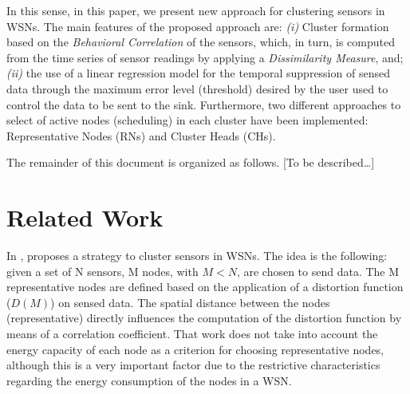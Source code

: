 \documentclass[conference]{IEEEtran}
\begin{document}
In this sense, in this paper, we present new approach for clustering sensors in
WSNs. The main features of the proposed approach are: {\it (i)} Cluster
formation based on the \textit{Behavioral Correlation} of the sensors, which, in
turn, is computed from the time series of sensor readings by applying a
\textit{Dissimilarity Measure}, and; {\it (ii)} the use of a linear regression
model for the temporal suppression of sensed data through the maximum error
level (threshold) desired by the user used to control the data to be sent to the
sink. Furthermore, two different approaches to select of active nodes
(scheduling) in each cluster have been implemented: Representative Nodes (RNs)
and Cluster Heads (CHs).



The remainder of this document is organized as follows. [To be described\ldots]


\section{Related Work}

In \cite{Vuran2004}, proposes a strategy to cluster sensors in WSNs. The idea is
the following: given a set of N sensors, M nodes, with $M < N$, are chosen to
send data. The M representative nodes are defined based on the application of a
distortion function ($D(M)$) on sensed data.
The spatial distance between the nodes (representative) directly influences the
computation of the distortion function by means of a correlation coefficient.
That work does not take into account the energy capacity of each node as a
criterion for choosing representative nodes, although this is a very important
factor due to the restrictive characteristics regarding the energy consumption
of the nodes in a WSN.
\end{document}
